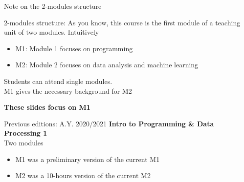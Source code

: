 \documentclass{beamer}%
\begin{document}
\begin{frame}{Note on the 2-modules structure}
	\begin{block}{2-modules structure: \myurl{\homepage}}
		As you know, this course is the first module of a teaching unit of two modules. Intuitively
		\begin{itemize}
			\item M1: Module 1 focuses on programming
			\item M2: Module 2 focuses  on data analysis and machine learning
		\end{itemize}
		Students can attend single modules. \\ M1 gives the necessary background for M2
		\begin{center}\textbf{These slides focus on M1}\end{center}
	\end{block}	
	\begin{block}{Previous editions: A.Y. 2020/2021}
		\textbf{Intro to Programming \& Data Processing 1}\\ Two modules
		\begin{itemize}
			\item M1 was a preliminary version of the current M1
			\item M2 was a 10-hours version of the current M2
		\end{itemize}
	\end{block}
\end{frame}
\end{document}
